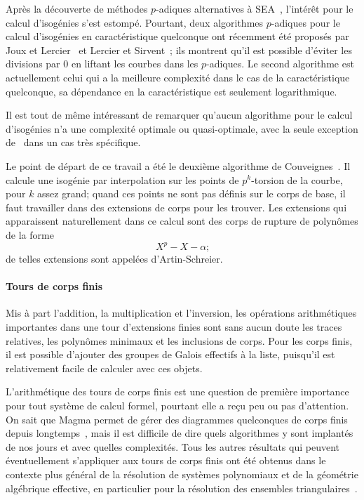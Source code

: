 Après la découverte de méthodes $p$-adiques alternatives à
SEA~\cite{satoh00,fouquet+gaudry+harley00}, l'intérêt pour le calcul
d'isogénies s'est estompé. Pourtant, deux algorithmes $p$-adiques pour
le calcul d'isogénies en caractéristique quelconque ont récemment été
proposés par Joux et Lercier~\cite{joux+lercier06} et Lercier et
Sirvent~\cite{lercier+sirvent08}; ils montrent qu'il est possible
d'éviter les divisions par $0$ en liftant les courbes dans les
$p$-adiques. Le second algorithme est actuellement celui qui a la
meilleure complexité dans le cas de la caractéristique quelconque, sa
dépendance en la caractéristique est seulement logarithmique.

Il est tout de même intéressant de remarquer qu'aucun algorithme pour
le calcul d'isogénies n'a une complexité optimale ou quasi-optimale,
avec la seule exception de~\cite{bostan+morain+salvy+schost08} dans un
cas très spécifique.

Le point de départ de ce travail a été le deuxième algorithme de
Couveignes~\cite{couveignes96}. Il calcule une isogénie par
interpolation sur les points de $p^k$-torsion de la courbe, pour $k$
assez grand; quand ces points ne sont pas définis sur le corps de
base, il faut travailler dans des extensions de corps pour les
trouver. Les extensions qui apparaissent naturellement dans ce calcul sont des corps de rupture de polynômes de la forme
\[X^p-X-\alpha\text{;}\] de telles extensions sont appelées
d'Artin-Schreier.

\paragraph*{Tours de corps finis}
\label{sec:tours-de-corps}
Mis à part l'addition, la multiplication et l'inversion, les
opérations arithmétiques importantes dans une tour d'extensions finies
sont sans aucun doute les traces relatives, les polynômes minimaux et
les inclusions de corps. Pour les corps finis, il est possible
d'ajouter des groupes de Galois effectifs à la liste, puisqu'il est
relativement facile de calculer avec ces objets.

L'arithmétique des tours de corps finis est une question de première
importance pour tout système de calcul formel, pourtant elle a reçu
peu ou pas d'attention. On sait que Magma permet de gérer des
diagrammes quelconques de corps finis depuis
longtemps~\cite{bosma+cannon+steel97}, mais il est difficile de dire
quels algorithmes y sont implantés de nos jours et avec quelles
complexités. Tous les autres résultats qui peuvent éventuellement
s'appliquer aux tours de corps finis ont été obtenus dans le contexte
plus général de la résolution de systèmes polynomiaux et de la
géométrie algébrique effective, en particulier pour la résolution des
ensembles
triangulaires~\cite{diaz+gonzalez01,giusti+lecerf+salvy01,bostan+salvy+schost03,pascal+schost06,li+moreno+schost07,dahan+jin+moreno+schost08,boulier+lemaire+moreno01,FGLM,rouiller99,alonso+becker+roy+wormann}.

